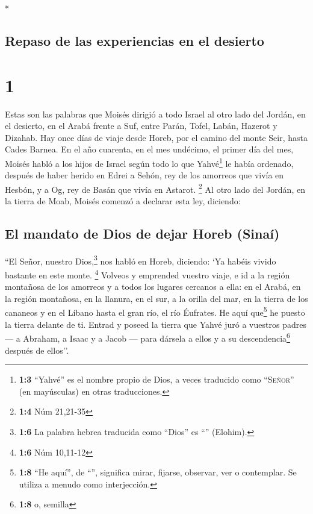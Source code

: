 \begin{paracol}{2} \switchcolumn[0]*

\hypertarget{repaso-de-las-experiencias-en-el-desierto}{%
\subsection{Repaso de las experiencias en el
desierto}\label{repaso-de-las-experiencias-en-el-desierto}}

\hypertarget{section}{%
\section{1}\label{section}}

 Estas son las palabras que Moisés dirigió a todo Israel
al otro lado del Jordán, en el desierto, en el Arabá frente a Suf, entre
Parán, Tofel, Labán, Hazerot y Dizahab.  Hay once días de
viaje desde Horeb, por el camino del monte Seir, hasta Cades Barnea.
 En el año cuarenta, en el mes undécimo, el primer día del
mes, Moisés habló a los hijos de Israel según todo lo que
Yahvé\footnote{\textbf{1:3} ``Yahvé'' es el nombre propio de Dios, a
  veces traducido como ``\textsc{Señor}'' (en mayúsculas) en otras
  traducciones.} le había ordenado,  después de haber
herido en Edrei a Sehón, rey de los amorreos que vivía en Hesbón, y a
Og, rey de Basán que vivía en Astarot. \footnote{\textbf{1:4} Núm
  21,21-35}  Al otro lado del Jordán, en la tierra de
Moab, Moisés comenzó a declarar esta ley, diciendo:

\hypertarget{el-mandato-de-dios-de-dejar-horeb-sinauxed}{%
\subsection{El mandato de Dios de dejar Horeb
(Sinaí)}\label{el-mandato-de-dios-de-dejar-horeb-sinauxed}}

 ``El Señor, nuestro Dios,\footnote{\textbf{1:6} La
  palabra hebrea traducida como ``Dios'' es ``'' (Elohim).}
nos habló en Horeb, diciendo: `Ya habéis vivido bastante en este monte.
\footnote{\textbf{1:6} Núm 10,11-12}  Volveos y emprended
vuestro viaje, e id a la región montañosa de los amorreos y a todos los
lugares cercanos a ella: en el Arabá, en la región montañosa, en la
llanura, en el sur, a la orilla del mar, en la tierra de los cananeos y
en el Líbano hasta el gran río, el río Éufrates.  He aquí
que\footnote{\textbf{1:8} ``He aquí'', de ``'', significa
  mirar, fijarse, observar, ver o contemplar. Se utiliza a menudo como
  interjección.} he puesto la tierra delante de ti. Entrad y poseed la
tierra que Yahvé juró a vuestros padres --- a Abraham, a Isaac y a Jacob
--- para dársela a ellos y a su descendencia\footnote{\textbf{1:8} o,
  semilla} después de ellos''.


\end{paracol}
